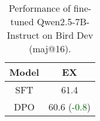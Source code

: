 \begin{table}[h!]
    \centering
\begin{adjustbox}{max width=\columnwidth}
    \begin{tabular}{c|c}
    \toprule
       \textbf{Model}  &  \textbf{EX} \\
    \midrule
        SFT & 61.4 \\
        DPO & 60.6 (\textcolor{darkgreen}{-0.8}) \\
    \bottomrule
    \end{tabular}
\end{adjustbox}
\caption{Performance of fine-tuned Qwen2.5-7B-Instruct on Bird Dev (maj@16). }
\end{table}
